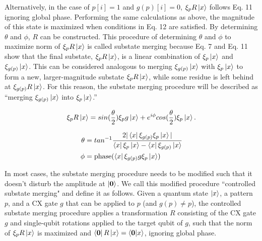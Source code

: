 Alternatively, in the case of $p[i] = 1$ and $g(p)[i] = 0$, $ \xi_pR\mathinner{|{x}\rangle} $ follows Eq. 11 ignoring global phase. Performing the same calculations as above, the magnitude of this state is maximized when conditions in Eq. 12 are satisfied. By determining $\theta$ and $\phi$, $R$ can be constructed. This procedure of determining $\theta$ and $\phi$ to maximize norm of $\xi_pR\mathinner{|{x}\rangle}$ is called substate merging because Eq. 7 and 
Eq. 11 show that the final substate, $\xi_p R\mathinner{|{x}\rangle}$, is a linear
combination of $\xi_p\mathinner{|{x}\rangle}$ and $\xi_{g(p)}\mathinner{|{x}\rangle}$. This can be considered analogous to merging $\xi_{g(p)}\mathinner{|{x}\rangle}$ with $\xi_p\mathinner{|{x}\rangle}$ to form a new, larger-magnitude substate
$\xi_p R\mathinner{|{x}\rangle}$, while some residue is left behind at $\xi_{g(p)}R\mathinner{|{x}\rangle}$. For this
reason, the substate merging procedure will be described as ``merging $\xi_{g(p)}\mathinner{|{x}\rangle}$ into $\xi_p\mathinner{|{x}\rangle}$.''

\begin{equation}\label{eq11}
\xi_p R\mathinner{|{x}\rangle} = sin(\frac{\theta}{2})\xi_p g\mathinner{|{x}\rangle} + e^{i\phi}cos(\frac{\theta}{2})\xi_p\mathinner{|{x}\rangle}.
\end{equation}

\begin{align}
\label{eq12}
\theta &= tan^{-1} \frac{2| \mathinner{\langle{x}|}\xi_{g(p)}\xi_p\mathinner{|{x}\rangle} |}{\mathinner{\langle{x}|}\xi_p\mathinner{|{x}\rangle} - \mathinner{\langle{x}|}\xi_{g(p)}\mathinner{|{x}\rangle}} \nonumber \\
\phi &= \text{phase}(\mathinner{\langle{x}|} \xi_{g(p)} g \xi_p\mathinner{|{x}\rangle})
\end{align}



In most cases, the substate merging procedure needs to be modified such that it
doesn't disturb the amplitude at $\mathinner{|{\mathbf{0}}\rangle}$. We call this modified procedure
``controlled substate merging" and define it as follows. Given a quantum state
$\mathinner{|{x}\rangle}$, a pattern $p$, and a CX gate $g$ that can be applied to $p$ (and
$g(p) \neq p$), the
controlled substate merging procedure applies a transformation $R$ consisting
of the CX gate $g$ and single-qubit rotations applied to the target qubit of
$g$, such that the norm of $\xi_p R\mathinner{|{x}\rangle} $ is maximized and
$\mathinner{\langle{\mathbf{0}}|}R\mathinner{|{x}\rangle} = \mathinner{\langle{\mathbf{0}|x}\rangle}$, ignoring global phase.

